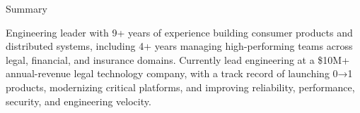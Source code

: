 \documentclass{resume} %
\begin{document}

\begin{rSection}{Summary}

Engineering leader with 9+ years of experience building consumer products and distributed systems, including 4+ years managing high-performing teams across legal, financial, and insurance domains. Currently lead engineering at a \$10M+ annual-revenue legal technology company, with a track record of launching 0→1 products, modernizing critical platforms, and improving reliability, performance, security, and engineering velocity.

\end{rSection}

\end{document}
